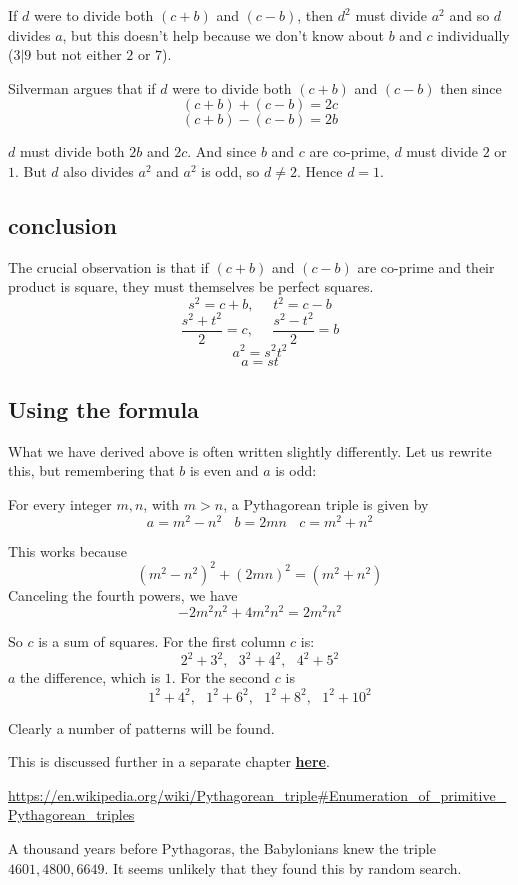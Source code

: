 \documentclass[11pt, oneside]{article}
\begin{document}
If $d$ were to divide both $(c + b)$ and $(c - b)$, then $d^2$ must divide $a^2$ and so $d$ divides $a$, but this doesn't help because we don't know about $b$ and $c$ individually ($3|9$ but not either $2$ or $7$).

Silverman argues that if $d$ were to divide both $(c + b)$ and $(c - b)$ then since
\[ (c + b) + (c - b) = 2c \]
\[ (c + b) - (c - b) = 2b \]

$d$ must divide both $2b$ and $2c$.  And since $b$ and $c$ are co-prime, $d$ must divide $2$ or $1$.  But $d$ also divides $a^2$ and $a^2$ is odd, so $d \ne 2$.  Hence $d = 1$.

\subsection*{conclusion}

The crucial observation is that if $(c + b)$ and $(c - b)$ are co-prime and their product is square, they must themselves be perfect squares.
\[ s^2 = c + b, \ \ \ \ \ \ t^2 = c - b \]
\[ \frac{s^2 + t^2}{2} = c, \ \ \ \ \ \ \frac{s^2 - t^2}{2} = b \]
\[ a^2 = s^2 t^2 \]
\[ a = st \]

\subsection*{Using the formula}

What we have derived above is often written slightly differently.  Let us rewrite this, but remembering that $b$ is even and $a$ is odd:

For every integer $m,n$, with $m > n$, a Pythagorean triple is given by
\[ a = m^2 - n^2 \ \ \ \ b = 2mn \ \ \ \ c = m^2 + n^2 \]

This works because
\[ (m^2 - n^2)^2 + (2mn)^2  =  (m^2 + n^2) \]
Canceling the fourth powers, we have
\[ -2m^2n^2 + 4m^2n^2 = 2m^2n^2 \]

So $c$ is a sum of squares.  For the first column $c$ is:
\[ 2^2 + 3^2, \ \ \ 3^2 + 4^2, \ \ \ 4^2 + 5^2 \]
 $a$ the difference, which is $1$.  For the second $c$ is
\[ 1^2 + 4^2, \ \ \ 1^2 + 6^2, \ \ \ 1^2 + 8^2, \ \ \ 1^2 + 10^2 \]

Clearly a number of patterns will be found.

This is discussed further in a separate chapter \hyperref[sec:pythagorean_triples]{\textbf{here}}.

\url{https://en.wikipedia.org/wiki/Pythagorean_triple#Enumeration_of_primitive_Pythagorean_triples}

A thousand years before Pythagoras, the Babylonians knew the triple $4601,4800,6649$.  It seems unlikely that they found this by random search.
\end{document}
